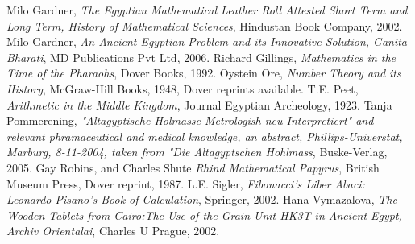 \documentclass[12pt]{article}
\begin{document}
\begin{thebibliography}{9}
 Milo Gardner, \emph{The Egyptian Mathematical Leather Roll Attested Short Term and Long Term, History of Mathematical Sciences}, Hindustan Book Company, 2002.
 Milo Gardner, \emph{An Ancient Egyptian Problem and its Innovative Solution, Ganita Bharati}, MD Publications Pvt Ltd, 2006.
Richard Gillings, \emph{Mathematics in the Time of the Pharaohs}, Dover Books, 1992.
 Oystein Ore, \emph{Number Theory and its History}, McGraw-Hill Books, 1948, Dover reprints available.
 T.E. Peet, \emph{Arithmetic in the Middle Kingdom}, Journal Egyptian Archeology, 1923.
 Tanja Pommerening, \emph{"Altagyptische Holmasse Metrologish neu Interpretiert" and relevant phramaceutical and medical knowledge, an abstract,  Phillips-Universtat, Marburg, 8-11-2004, taken from "Die Altagyptschen Hohlmass}, Buske-Verlag, 2005.
 Gay Robins, and Charles Shute \emph{Rhind Mathematical Papyrus}, British Museum Press, Dover reprint, 1987.
 L.E. Sigler, \emph{Fibonacci's Liber Abaci: Leonardo Pisano's Book of Calculation}, Springer, 2002.
 Hana Vymazalova, \emph{The Wooden Tablets from Cairo:The Use of the Grain Unit HK3T in Ancient Egypt, Archiv Orientalai}, Charles U Prague, 2002.
\end{thebibliography}




\end{document}
